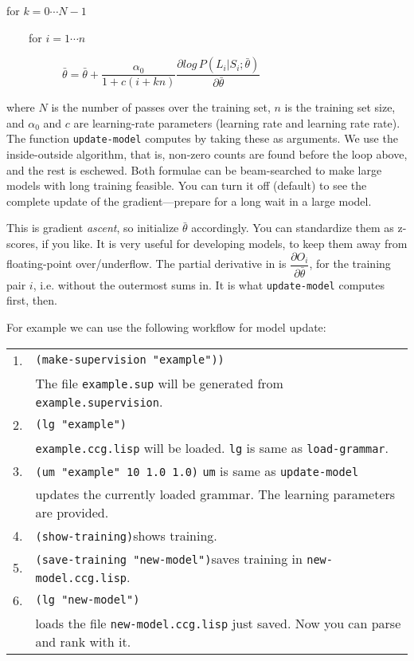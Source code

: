 \documentclass[11pt]{article}
\begin{document}
\noindent for $k= 0 \cdots N-1$

\noindent~~~~for $i= 1 \cdots n$

\noindent~~~~~~~~~~$\bar{\theta} = \bar{\theta} + \dfrac{\alpha_0}{1+c(i+kn)} \dfrac{\partial log\,P(L_i|S_i; \bar{\theta})}
{\partial \bar{\theta}}$\medskip

\noindent where $N$ is the number of passes over the training set, $n$ is the training set size, and $\alpha_0$ and $c$ are learning-rate parameters
(learning rate and learning rate rate). The function \verb|update-model| computes by taking these as arguments.
We use the inside-outside algorithm, that is, non-zero counts are found before the loop above, and the rest is eschewed. { Both formulae can be beam-searched to make large models with long training feasible. You can turn it off (default) to see the complete update of the gradient---prepare for a long wait
in a large model.}

This is gradient \emph{ascent}, so initialize $\bar{\theta}$ accordingly. {You can standardize them as z-scores, if you like.}
{It is very useful for developing models, to keep them away from floating-point over/underflow.}
The partial derivative in is $\dfrac{\partial O_i}{\partial\bar{\theta}}$, for the training pair $i$, i.e. without the 
outermost sums in. It is what \verb|update-model| computes first, then.


{For example we can use the following workflow for model update:}

\begin{tabular}{ll}
1.  & \verb|(make-supervision "example"))| \\ &
The file \verb+example.sup+ will be generated from \verb+example.supervision+. \\
2. & \verb|(lg "example")| \\
& \verb+example.ccg.lisp+ will be loaded. \verb+lg+ is same as \verb+load-grammar+.\\
3. & \verb+(um "example" 10 1.0 1.0)+ \hfill \verb+um+ is same as \verb+update-model+\\
& updates the currently loaded grammar. The learning parameters are provided.\\
4. & \verb+(show-training)+\hfill shows training.\\
5. & \verb+(save-training "new-model")+\hfill saves training in \verb+new-model.ccg.lisp+.\\
6. & \verb|(lg "new-model")|\\
&  loads the file \verb|new-model.ccg.lisp| just saved. Now you can parse and rank with it.\\
\end{tabular}
\end{document}
